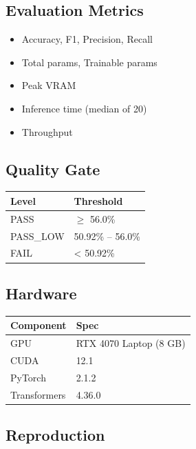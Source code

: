 \subsection{Evaluation Metrics}

\begin{itemize}
\item Accuracy, F1, Precision, Recall
\item Total params, Trainable params
\item Peak VRAM
\item Inference time (median of 20)
\item Throughput

\end{itemize}
\subsection{Quality Gate}

\begin{table}[H]
\centering
\small
\begin{tabular}{ll}
\toprule
\textbf{Level} & \textbf{Threshold} \\
\midrule
PASS & $\ge$ 56.0\% \\
PASS\_LOW & 50.92\% -- 56.0\% \\
FAIL & \textless{} 50.92\% \\
\bottomrule
\end{tabular}
\end{table}

\subsection{Hardware}

\begin{table}[H]
\centering
\small
\begin{tabular}{ll}
\toprule
\textbf{Component} & \textbf{Spec} \\
\midrule
GPU & RTX 4070 Laptop (8 GB) \\
CUDA & 12.1 \\
PyTorch & 2.1.2 \\
Transformers & 4.36.0 \\
\bottomrule
\end{tabular}
\end{table}

\subsection{Reproduction}

